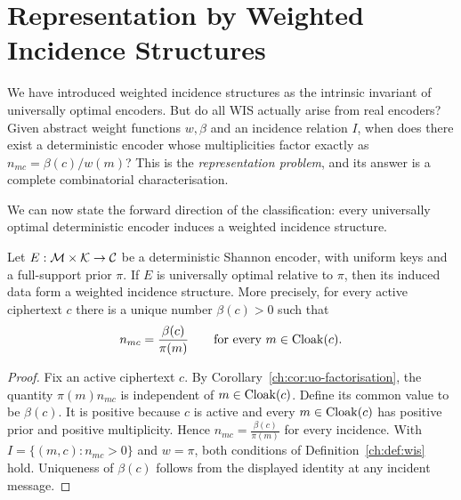 \chapter[Representation by WIS]{Representation by Weighted Incidence Structures}\label{ch:sec:representation}

We have introduced weighted incidence structures as the intrinsic
invariant of universally optimal encoders.  But do all WIS actually
arise from real encoders?  Given abstract weight functions $w,\beta$
and an incidence relation $I$, when does there exist a deterministic
encoder whose multiplicities factor exactly as $n_{mc}=\beta(c)/w(m)$?
This is the \emph{representation problem}, and its answer is a complete
combinatorial characterisation.

We can now state the forward direction of the classification: every
universally optimal deterministic encoder induces a weighted incidence
structure.
\begin{theorem}\label{ch:thm:representation}
Let $E:\mathcal{M}\times\mathcal{K}\to\mathcal{C}$ be a deterministic Shannon encoder, with uniform keys and a full-support prior $\pi$. If $E$ is universally optimal relative to $\pi$, then its induced data form a weighted incidence structure. More precisely, for every active ciphertext $c$ there is a unique number $\beta(c)>0$ such that
\[
 n_{mc}=\frac{\beta(c)}{\pi(m)}
 \qquad\text{for every }m\in\operatorname{Cloak}(c).
\]
\end{theorem}
\begin{proof}
Fix an active ciphertext $c$. By Corollary~\ref{ch:cor:uo-factorisation}, the quantity $\pi(m)n_{mc}$ is independent of $m\in\operatorname{Cloak}(c)$. Define its common value to be $\beta(c)$. It is positive because $c$ is active and every $m\in\operatorname{Cloak}(c)$ has positive prior and positive multiplicity. Hence $n_{mc}=\frac{\beta(c)}{\pi(m)}$ for every incidence. With $I=\{(m,c):n_{mc}>0\}$ and $w=\pi$, both conditions of Definition~\ref{ch:def:wis} hold. Uniqueness of $\beta(c)$ follows from the displayed identity at any incident message.
\end{proof}

